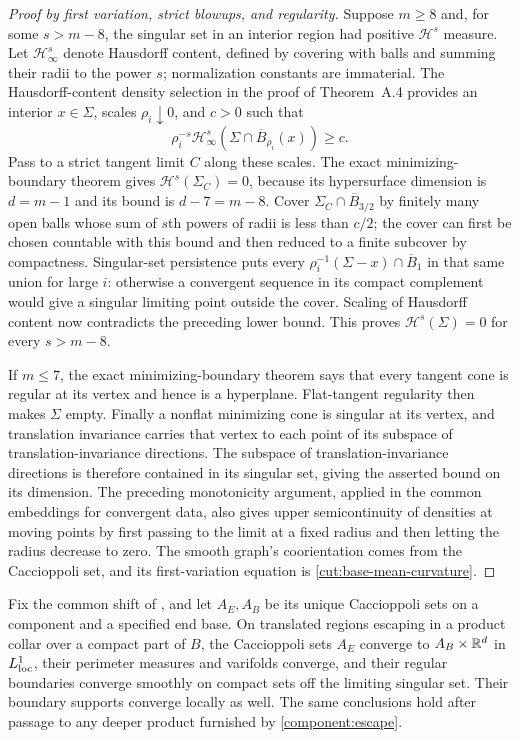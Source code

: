 \begin{proof}[Proof by first variation, strict blowups, and regularity]
Suppose $m\ge8$ and, for some
$s>m-8$, the singular set in an interior region had positive
$\mathcal H^s$ measure.  Let $\mathcal H^s_\infty$ denote Hausdorff
content, defined by covering with balls and summing their radii to
the power $s$; normalization constants are immaterial.
The Hausdorff-content density selection in the proof of Theorem~A.4
provides an interior $x\in\Sigma$, scales $\rho_i\downarrow0$, and
$c>0$ such that
\[
       \rho_i^{-s}\mathcal H^s_\infty
               (\Sigma\cap\overline B_{\rho_i}(x))\ge c.
\]
Pass to a strict tangent limit $C$ along these scales.  The exact
minimizing-boundary theorem gives
$\mathcal H^s(\Sigma_C)=0$, because its hypersurface dimension is
$d=m-1$ and its bound is $d-7=m-8$.
Cover $\Sigma_C\cap\overline B_{3/2}$ by finitely many open balls
whose sum of $s$th powers of radii is less than $c/2$; the cover can
first be chosen countable with this bound and then reduced to a finite
subcover by compactness.  Singular-set persistence puts every
$\rho_i^{-1}(\Sigma-x)\cap\overline B_1$ in that same union for large
$i$: otherwise a convergent sequence in its compact complement would
give a singular limiting point outside the cover.  Scaling of
Hausdorff content now contradicts the preceding lower bound.
This proves $\mathcal H^s(\Sigma)=0$ for every $s>m-8$.

If $m\le7$, the exact minimizing-boundary theorem says that every tangent
cone is regular at its vertex and hence is a hyperplane.  Flat-tangent
regularity then makes $\Sigma$ empty.  Finally a nonflat minimizing
cone is singular at its vertex, and translation invariance carries
that vertex to each point of its subspace of translation-invariance directions.  The subspace of translation-invariance directions is therefore
contained in its singular set, giving the asserted bound on its dimension.
The preceding monotonicity argument, applied in the common embeddings
for convergent data, also gives upper semicontinuity of densities at
moving points by first passing to the limit at a fixed radius and then
letting the radius decrease to zero.  The smooth graph's coorientation
comes from the Caccioppoli set, and its first-variation equation is
\eqref{cut:base-mean-curvature}.
\end{proof}


\begin{corollary}
\label{cut:end-convergence}
Fix the common shift of , and let
$A_E,A_B$ be its unique Caccioppoli sets on a component and a specified end base.  On translated regions escaping in a
product collar over a compact part of $B$, the Caccioppoli sets $A_E$ converge to
$A_B\times\mathbb R^d$ in $L^1_{\rm loc}$, their perimeter measures and
varifolds converge, and their regular boundaries converge smoothly on
compact sets off the limiting singular set.  Their boundary supports
converge locally as well.  The same conclusions hold after passage to
any deeper product furnished by \cref{component:escape}.
\end{corollary}

